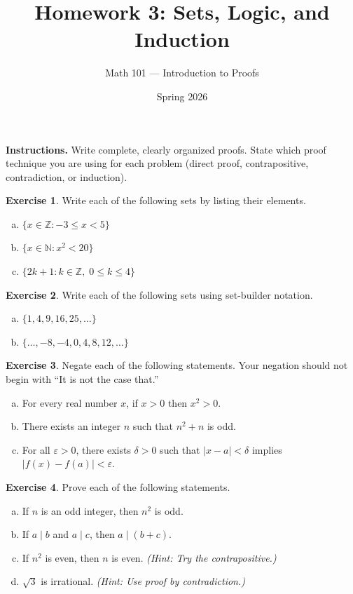 \documentclass[11pt]{amsart}
\title{Homework 3: Sets, Logic, and Induction}
\author{Math 101 --- Introduction to Proofs}
\date{Spring 2026}
\theoremstyle{definition}
\newtheorem{exercise}{Exercise}
\begin{document}
\maketitle

\textbf{Instructions.} Write complete, clearly organized proofs. State which proof technique you are using for each problem (direct proof, contrapositive, contradiction, or induction).

\begin{exercise}
Write each of the following sets by listing their elements.
\begin{enumerate}[(a)]
  \item $\{ x \in \mathbb{Z} : -3 \leq x < 5 \}$
  \item $\{ x \in \mathbb{N} : x^2 < 20 \}$
  \item $\{ 2k + 1 : k \in \mathbb{Z}, \; 0 \leq k \leq 4 \}$
\end{enumerate}
\end{exercise}

\begin{exercise}
Write each of the following sets using set-builder notation.
\begin{enumerate}[(a)]
  \item $\{1, 4, 9, 16, 25, \ldots\}$
  \item $\{\ldots, -8, -4, 0, 4, 8, 12, \ldots\}$
\end{enumerate}
\end{exercise}

\begin{exercise}
Negate each of the following statements. Your negation should not begin with ``It is not the case that.''
\begin{enumerate}[(a)]
  \item For every real number $x$, if $x > 0$ then $x^2 > 0$.
  \item There exists an integer $n$ such that $n^2 + n$ is odd.
  \item For all $\varepsilon > 0$, there exists $\delta > 0$ such that $|x - a| < \delta$ implies $|f(x) - f(a)| < \varepsilon$.
\end{enumerate}
\end{exercise}

\begin{exercise}
Prove each of the following statements.
\begin{enumerate}[(a)]
  \item If $n$ is an odd integer, then $n^2$ is odd.
  \item If $a \mid b$ and $a \mid c$, then $a \mid (b + c)$.
  \item If $n^2$ is even, then $n$ is even. \emph{(Hint: Try the contrapositive.)}
  \item $\sqrt{3}$ is irrational. \emph{(Hint: Use proof by contradiction.)}
\end{enumerate}
\end{exercise}
\end{document}
